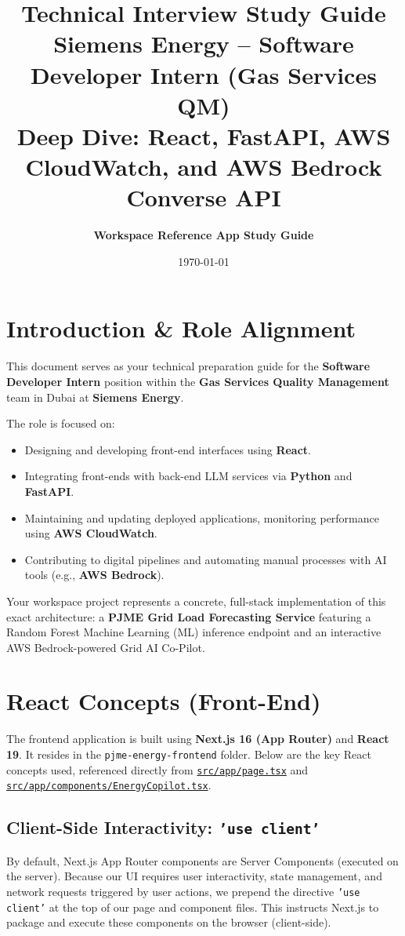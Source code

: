 \documentclass[11pt,a4paper]{article}
\title{\textbf{Technical Interview Study Guide\\ Siemens Energy -- Software Developer Intern (Gas Services QM)}\\ \large Deep Dive: React, FastAPI, AWS CloudWatch, and AWS Bedrock Converse API}
\author{\textbf{Workspace Reference App Study Guide}}
\date{\today}
\begin{document}
\maketitle
\tableofcontents
\newpage

\section{Introduction \& Role Alignment}
This document serves as your technical preparation guide for the \textbf{Software Developer Intern} position within the \textbf{Gas Services Quality Management} team in Dubai at \textbf{Siemens Energy}. 

The role is focused on:
\begin{itemize}
    \item Designing and developing front-end interfaces using \textbf{React}.
    \item Integrating front-ends with back-end LLM services via \textbf{Python} and \textbf{FastAPI}.
    \item Maintaining and updating deployed applications, monitoring performance using \textbf{AWS CloudWatch}.
    \item Contributing to digital pipelines and automating manual processes with AI tools (e.g., \textbf{AWS Bedrock}).
\end{itemize}

Your workspace project represents a concrete, full-stack implementation of this exact architecture: a \textbf{PJME Grid Load Forecasting Service} featuring a Random Forest Machine Learning (ML) inference endpoint and an interactive AWS Bedrock-powered Grid AI Co-Pilot.

\section{React Concepts (Front-End)}
The frontend application is built using \textbf{Next.js 16 (App Router)} and \textbf{React 19}. It resides in the \texttt{pjme-energy-frontend} folder. Below are the key React concepts used, referenced directly from \href{file:///c:/Akhil/AI_Engineer/1stProject/pjme-energy-frontend/src/app/page.tsx}{\texttt{src/app/page.tsx}} and \href{file:///c:/Akhil/AI_Engineer/1stProject/pjme-energy-frontend/src/app/components/EnergyCopilot.tsx}{\texttt{src/app/components/EnergyCopilot.tsx}}.

\subsection{Client-Side Interactivity: \texttt{'use client'}}
By default, Next.js App Router components are Server Components (executed on the server). Because our UI requires user interactivity, state management, and network requests triggered by user actions, we prepend the directive \texttt{'use client'} at the top of our page and component files. This instructs Next.js to package and execute these components on the browser (client-side).
\end{document}
